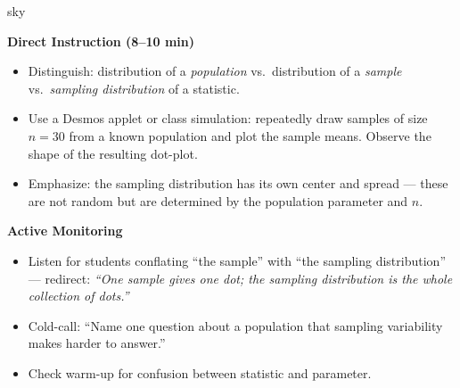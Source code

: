 \documentclass[10pt]{article}
\begin{document}
\begin{skillbox}{sky}
\begin{minipage}[t]{0.48\linewidth}
    \textbf{Direct Instruction (8--10 min)}
    \begin{itemize}
        \item Distinguish: distribution of a \emph{population} vs.\ distribution of a
              \emph{sample} vs.\ \emph{sampling distribution} of a statistic.
        \item Use a Desmos applet or class simulation: repeatedly draw samples of size
              $n = 30$ from a known population and plot the sample means. Observe the
              shape of the resulting dot-plot.
        \item Emphasize: the sampling distribution has its own center and spread ---
              these are not random but are determined by the population parameter and $n$.
    \end{itemize}
\end{minipage}
\hfill
\begin{minipage}[t]{0.48\linewidth}
    \textbf{Active Monitoring}
    \begin{itemize}
        \item Listen for students conflating ``the sample'' with ``the sampling
              distribution'' --- redirect: \textit{``One sample gives one dot; the
              sampling distribution is the whole collection of dots.''}
        \item Cold-call: ``Name one question about a population that sampling
              variability makes harder to answer.''
        \item Check warm-up for confusion between statistic and parameter.
    \end{itemize}
\end{minipage}
\end{skillbox}
\end{document}
